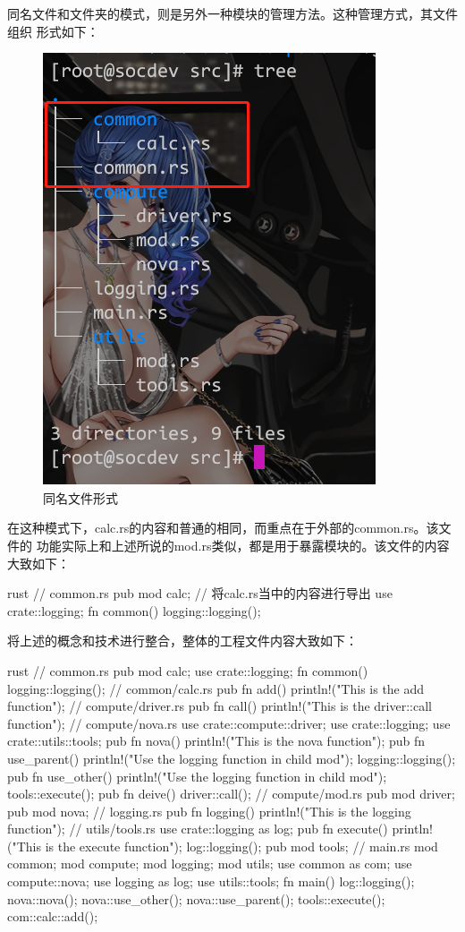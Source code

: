 同名文件和文件夹的模式，则是另外一种模块的管理方法。这种管理方式，其文件组织
形式如下：
\begin{figure}[H]
  \centering
  \includegraphics[scale=0.6]{rust_mod_file.png}
  \caption{同名文件形式}
  \label{fig:rust_mod_file}
\end{figure}
在这种模式下，calc.rs的内容和普通的相同，而重点在于外部的common.rs。该文件的
功能实际上和上述所说的mod.rs类似，都是用于暴露模块的。该文件的内容大致如下：
\begin{code-block}{rust}
// common.rs
pub mod calc; // 将calc.rs当中的内容进行导出
use crate::logging;
fn common() {
    logging::logging();
}
\end{code-block}

将上述的概念和技术进行整合，整体的工程文件内容大致如下：
\begin{code-block}{rust}
// common.rs
pub mod calc;
use crate::logging;
fn common() {
    logging::logging();
}
// common/calc.rs
pub fn add() {
    println!("This is the add function");
}
// compute/driver.rs
pub fn call() {
    println!("This is the driver::call function");
}
// compute/nova.rs
use crate::compute::driver;
use crate::logging;
use crate::utils::tools;
pub fn nova() {
    println!("This is the nova function");
}
pub fn use_parent() {
    println!("Use the logging function in child mod");
    logging::logging();
}
pub fn use_other() {
    println!("Use the logging function in child mod");
    tools::execute();
}
pub fn deive() {
    driver::call();
}
// compute/mod.rs
pub mod driver;
pub mod nova;
// logging.rs
pub fn logging() {
    println!("This is the logging function");
}
// utils/tools.rs
use crate::logging as log;
pub fn execute() {
    println!("This is the execute function");
    log::logging();
}
pub mod tools;
// main.rs
mod common;
mod compute;
mod logging;
mod utils;
use common as com;
use compute::nova;
use logging as log;
use utils::tools;
fn main() {
    log::logging();
    nova::nova();
    nova::use_other();
    nova::use_parent();
    tools::execute();
    com::calc::add();
}
\end{code-block}

